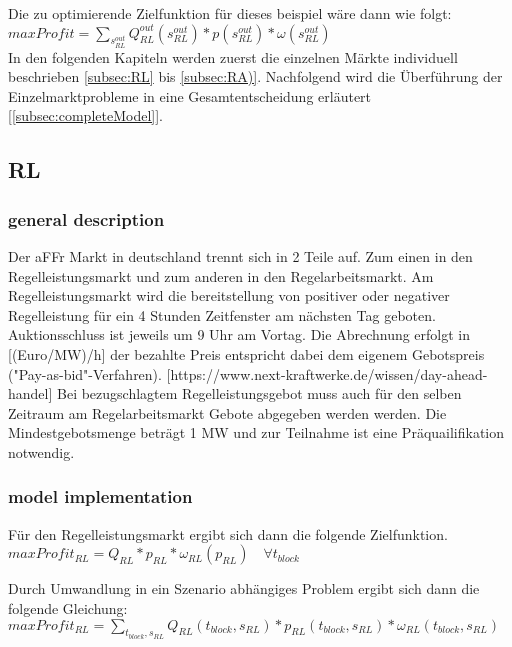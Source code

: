 Die zu optimierende Zielfunktion für dieses beispiel wäre dann wie folgt:\\
$max Profit = \sum_{s^{out}_{RL}} Q^{out}_{RL}(s^{out}_{RL}) * p(s^{out}_{RL}) * \omega(s^{out}_{RL})$\\

In den folgenden Kapiteln werden zuerst die einzelnen Märkte  individuell beschrieben \autoref{subsec:RL} bis \autoref{subsec:RA)}.
Nachfolgend wird die Überführung der Einzelmarktprobleme in eine Gesamtentscheidung erläutert [\autoref{subsec:completeModel}].

\subsection{RL}
\label{subsec:RL}
\subsubsection{general description}
Der aFFr Markt in deutschland trennt sich in 2 Teile auf. Zum einen in den Regelleistungsmarkt und zum anderen in den Regelarbeitsmarkt.
Am Regelleistungsmarkt wird die bereitstellung von positiver oder negativer Regelleistung für ein 4 Stunden Zeitfenster am nächsten Tag geboten.
Auktionsschluss ist jeweils um 9 Uhr am Vortag.
Die Abrechnung erfolgt in [(Euro/MW)/h] der bezahlte Preis entspricht dabei dem eigenem Gebotspreis ("Pay-as-bid"-Verfahren).
	[https://www.next-kraftwerke.de/wissen/day-ahead-handel]
Bei bezugschlagtem Regelleistungsgebot muss auch für den selben Zeitraum am Regelarbeitsmarkt Gebote abgegeben werden werden.
Die Mindestgebotsmenge beträgt 1 MW und zur Teilnahme ist eine Präquailifikation notwendig.

\subsubsection{model implementation}
Für den Regelleistungsmarkt ergibt sich dann die folgende Zielfunktion.\\

$max Profit_{RL} =  Q_{RL} * p_{RL} * \omega_{RL}(p_{RL}) \quad\forall t_{block}$

Durch Umwandlung in ein Szenario abhängiges Problem ergibt sich dann die folgende Gleichung:\\

$max Profit_{RL} = \sum_{t_{block}, s_{RL}} Q_{RL}(t_{block}, s_{RL}) * p_{RL}(t_{block}, s_{RL}) * \omega_{RL}(t_{block}, s_{RL})$\\

